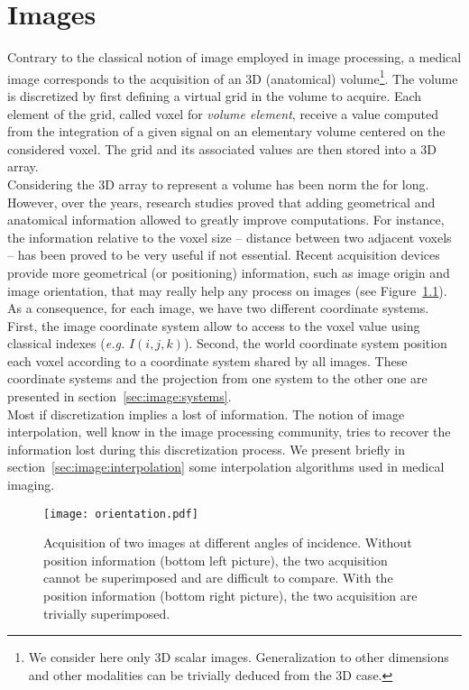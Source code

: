 \chapter{Images}


Contrary to the classical notion of image employed in image processing, a medical image corresponds to the acquisition of an 3D (anatomical) volume\footnote{We consider here only 3D scalar images. Generalization to other dimensions and other modalities can be trivially deduced from the 3D case.}. The volume is discretized by first defining a virtual grid in the volume to acquire. Each element of the grid, called voxel for \textit{volume element}, receive a value computed from the integration of a given signal on an elementary volume centered on the considered voxel. The grid and its associated values are then stored into a 3D array.
\\

Considering the 3D array to represent a volume has been norm the for long. However, over the years, research studies proved that adding geometrical and anatomical information allowed to greatly improve computations. For instance, the information relative to the voxel size -- distance between two adjacent voxels -- has been proved to be very useful if not essential. Recent acquisition devices provide more geometrical (or positioning) information, such as image origin and image orientation, that may really help any process on images (see Figure~\ref{fig:position}).
\\
As a consequence, for each image, we have two different coordinate systems. First, the image coordinate system allow to access to the voxel value using classical indexes (\textit{e.g.} $I(i,j,k)$). Second, the world coordinate system position each voxel according to a coordinate system shared by all images. These coordinate systems and the projection from one system to the other one are presented in section~\ref{sec:image:systems}.
\\

Most if discretization implies a lost of information. The notion of image interpolation, well know in the image processing community, tries to recover the information lost during this discretization process. We present briefly in section~\ref{sec:image:interpolation} some interpolation algorithms used in medical imaging.

%
\begin{figure}[!htbp]
\centering
\texttt{[image: orientation.pdf]} 
\caption{Acquisition of two images at different angles of incidence. Without position information (bottom left picture), the two acquisition cannot be superimposed and are difficult to compare. With the position information (bottom right picture), the two acquisition are trivially superimposed.}
\label{fig:position}
\end{figure}




